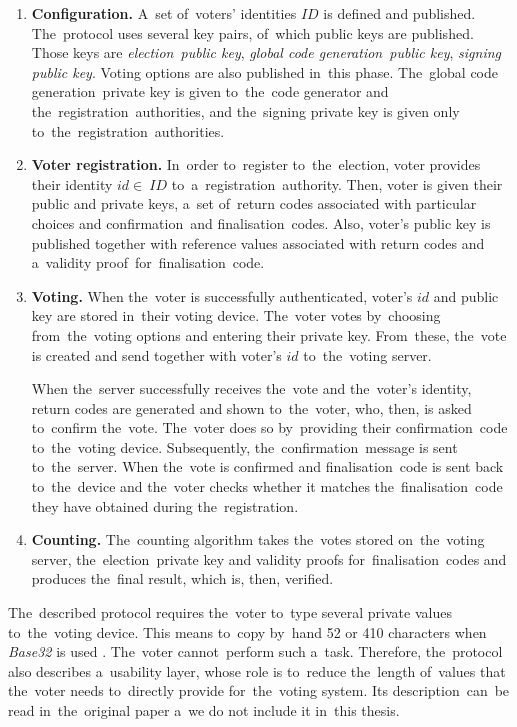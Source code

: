 \begin{enumerate}
\item \textbf{Configuration.} A~set of~voters' identities $ID$ is defined and published. The~protocol uses several key pairs, of~which public keys are published. Those keys are \emph{election~public key}, \emph{ global code generation~public key}, \emph{signing public key}. Voting options are also published in~this phase. The~global code generation~private key is given to~the~code generator and the~registration~authorities, and the~signing private key is given only to~the~registration~authorities.
\item \textbf{Voter registration.} In~order to~register to~the~election, voter provides their identity $id \in~ID$ to~a~registration~authority. Then, voter is given their public and private keys, a~set of~return codes associated with particular choices and confirmation~and finalisation~codes. Also, voter's public key is published together with reference values associated with return codes and a~validity proof~for~finalisation~code.
\item{ \textbf{Voting.} When the~voter is successfully authenticated, voter's $id$ and public key are stored in~their voting device. The~voter votes by~choosing from~the~voting options and entering their private key. From~these, the~vote is created and send together with voter's $id$ to~the~voting server. 

When the~server successfully receives the~vote and the~voter's identity, return codes are generated and shown to~the~voter, who, then, is asked to~confirm the~vote. The~voter does so by~providing their confirmation~code to~the~voting device. Subsequently, the~confirmation~message is sent to~the~server. When the~vote is confirmed and finalisation~code is sent back to~the~device and the~voter checks whether it matches the~finalisation~code they have obtained during the~registration.}
\item \textbf{Counting.} The~counting algorithm takes the~votes stored on~the~voting server, the~election~private key and validity proofs for~finalisation~codes and produces the~final result, which is, then, verified.
\end{enumerate}

The~described protocol requires the~voter to~type several private values to~the~voting device. This means to~copy by~hand 52 or 410 characters when \emph{Base32} is used \cite{Swiss}. The~voter cannot~perform such a~task. Therefore, the~protocol also describes a~usability layer, whose role is to~reduce the~length of~values that the~voter needs to~directly provide for~the~voting system. Its description~can~be read in~the~original paper a~we do not include it in~this thesis.



